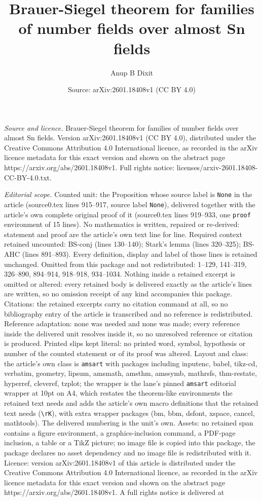 \documentclass[10pt,a4paper]{amsart}
\title[Brauer-Siegel theorem for families of number fields over alm]{Brauer-Siegel theorem for families of number fields over almost Sn fields}
\author{Anup B Dixit}
\date{Source: arXiv:2601.18408v1 (CC BY 4.0)}
\begin{document}
\maketitle

\noindent\emph{Source and licence.} Brauer-Siegel theorem for families of number fields over almost Sn fields. Version arXiv:2601.18408v1 (CC BY 4.0), distributed under the Creative Commons Attribution 4.0 International licence, as recorded in the arXiv licence metadata for this exact version and shown on the abstract page https://arxiv.org/abs/2601.18408v1. Full rights notice: licenses/arxiv-2601.18408-CC-BY-4.0.txt.\par\smallskip

\noindent\textit{Editorial scope.} Counted unit: the Proposition whose source label is \texttt{None} in the article (source0.tex lines 915--917, source label \texttt{None}), delivered together with the article's own complete original proof of it (source0.tex lines 919--933, one \texttt{proof} environment of 15 lines). No mathematics is written, repaired or re-derived: statement and proof are the article's own text line for line. Required context retained uncounted: BS-conj (lines 130--140); Stark's lemma (lines 320--325); BS-AHC (lines 891--893). Every definition, display and label of those lines is retained unchanged. Omitted from this package and not redistributed: 1--129, 141--319, 326--890, 894--914, 918--918, 934--1034. Nothing inside a retained excerpt is omitted or altered: every retained body is delivered exactly as the article's lines are written, so no omission receipt of any kind accompanies this package. Citations: the retained excerpts carry no citation command at all, so no bibliography entry of the article is transcribed and no reference is redistributed. Reference adaptation: none was needed and none was made; every reference inside the delivered unit resolves inside it, so no unresolved reference or citation is produced. Printed slips kept literal: no printed word, symbol, hypothesis or number of the counted statement or of its proof was altered. Layout and class: the article's own class is \texttt{amsart} with packages including inputenc, babel, tikz-cd, verbatim, geometry, lipsum, amsmath, amsthm, amssymb, mathrsfs, thm-restate, hyperref, cleveref, tzplot; the wrapper is the lane's pinned \texttt{amsart} editorial wrapper at 10pt on A4, which restates the theorem-like environments the retained text needs and adds the article's own macro definitions that the retained text needs (\texttt{\textbackslash rK}), with extra wrapper packages (bm, bbm, dsfont, xspace, cancel, mathtools). The delivered numbering is the unit's own. Assets: no retained span contains a figure environment, a graphics-inclusion command, a PDF-page inclusion, a table or a TikZ picture; no image file is copied into this package, the package declares no asset dependency and no image file is redistributed with it. Licence: version arXiv:2601.18408v1 of this article is distributed under the Creative Commons Attribution 4.0 International licence, as recorded in the arXiv licence metadata for this exact version and shown on the abstract page https://arxiv.org/abs/2601.18408v1. A full rights notice is delivered at 
\end{document}
